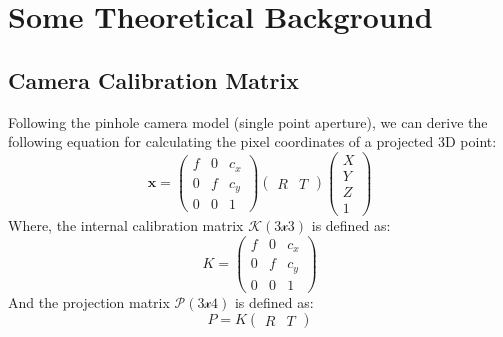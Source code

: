 \documentclass{article}
\begin{document}
\section{Some Theoretical Background}
\subsection{Camera Calibration Matrix}
Following the pinhole camera model (single point aperture), we can derive the following equation for calculating the pixel coordinates of a projected 3D point:
\begin{equation}
    \textbf{x} = \begin{pmatrix} f & 0 & c_{x}\\ 0 & f & c_{y} \\ 0 & 0 & 1\end{pmatrix}\begin{pmatrix} R & T\end{pmatrix}\begin{pmatrix} X\\Y\\Z\\1\end{pmatrix}
\end{equation}
Where, the internal calibration matrix $\mathcal{K (3x3)}$ is defined as:
\begin{equation}
    K = \begin{pmatrix} f & 0 & c_{x}\\ 0 & f & c_{y} \\ 0 & 0 & 1\end{pmatrix}
\end{equation}
And the projection matrix $\mathcal{P (3x4)}$ is defined as:
\begin{equation}
    P = K \begin{pmatrix} R & T \end{pmatrix}
\end{equation}
\end{document}
